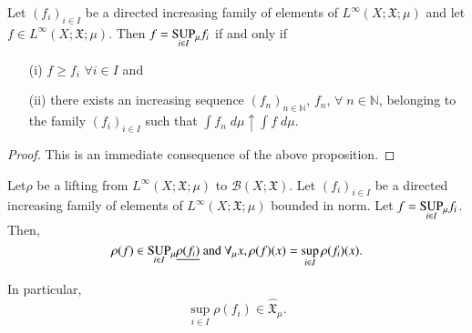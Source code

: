 \begin{corollary}\label{part1:chap3:coro29}
Let $(f_i)_{i \in I}$ be a directed increasing family of elements of
$L^\infty (X; \mathfrak{X}; \mu)$ and let $f \in L^\infty (X;
\mathfrak{X}; \mu)$. Then $f = \underset{i \in I}{\operatorname{SUP}}{}_\mu f_i$ if
and only if 
\begin{itemize}
\item[{\rm (i)}] $f \geq f_i$ $\forall i \in I$ and 

\item[{\rm (ii)}] there exists an increasing sequence $(f_n)_{n\in
  \mathbb{N}}$, $f_n$, $\forall \; n \in \mathbb{N}$, belonging to the
  family $(f_i)_{i \in I}$ such that $\int f_n \; d \mu \uparrow \int
  f \; d\mu$. 
\end{itemize}
\end{corollary}

\begin{proof}
This is an immediate consequence of the above proposition. 
\end{proof}

\begin{proposition}\label{part1:chap3:prop30}
Let\pageoriginale $\rho$ be a lifting from $L^\infty (X; \mathfrak{X};
\mu)$ to $\mathscr{B}(X; \mathfrak{X})$. Let $(f_i)_{i \in I}$ be a
directed increasing family of elements of $L^\infty(X; \mathfrak{X};
\mu)$ bou\-nded in norm. Let $f = \underset{i\in I}{\operatorname{SUP}}{}_\mu
f_i$. Then, 
$$
\rho(f) \in \underset{i \in I}{\operatorname{SUP}}{}_\mu \underline{\rho(f_i)} \text{ and }
\forall_\mu x, \rho(f) (x) = \sup\limits_{i \in I} \rho(f_i) (x). 
$$

In particular,
$$
\sup\limits_{i \in I} \rho(f_i) \in\hat{\mathfrak{X}}_\mu . 
$$
\end{proposition}

